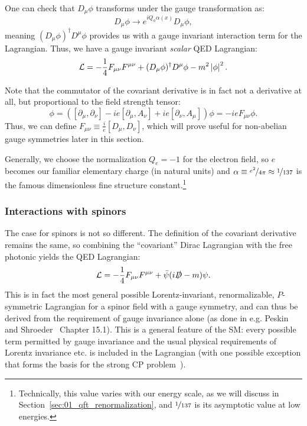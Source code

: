 One can check that $D_\mu\phi$ transforms under the gauge transformation as:
\begin{equation}
	\label{eq:01_qft_gt_maxwell_covariant_derivative_gauge}
	D_\mu\phi \rightarrow e^{iQ_\phi\alpha(x)}D_\mu\phi,
\end{equation}
meaning $(D_\mu\phi)^\dagger D^\mu\phi$ provides us with a gauge invariant interaction term for the Lagrangian.
Thus, we have a gauge invariant \textit{scalar} QED Lagrangian:
\begin{equation}
	\label{eq:01_qft_gt_maxwell_scalar_lagrangian}
	\mathcal L = -\frac{1}{4}F_{\mu\nu}F^{\mu\nu} + (D_\mu\phi)^\dagger D^\mu\phi - m^2\left\lvert \phi \right\rvert^2.
\end{equation}

Note that the commutator of the covariant derivative is in fact not a derivative at all, but proportional to the field strength tensor:
\begin{equation}
	[D_\mu, D_\nu]\phi = ([\partial_\mu, \partial_\nu] - ie[\partial_\mu, A_\nu] + ie[\partial_\nu, A_\mu])\phi = -ieF_{\mu\nu}\phi.
\end{equation}
Thus, we can define $F_{\mu\nu} \equiv \frac{i}{e}[D_\mu, D_\nu]$, which will prove useful for non-abelian gauge symmetries later in this section.

Generally, we choose the normalization $Q_e = -1$ for the electron field, so $e$ becomes our familiar elementary charge (in natural units) and $\alpha\equiv\cnicefrac{e^2}{4\pi} \approx \cnicefrac{1}{137}$ is the famous dimensionless fine structure constant.\footnote{Technically, this value varies with our energy scale, as we will discuss in Section~\ref{sec:01_qft_renormalization}, and $\cnicefrac{1}{137}$ is its asymptotic value at low energies.}

\subsubsection{Interactions with spinors}

The case for spinors is not so different. 
The definition of the covariant derivative remains the same, so combining the ``covariant'' Dirac Lagrangian with the free photonic yields the QED Lagrangian:
\begin{equation}
	\label{eq:01_qft_gt_maxwell_qed_lagrangian}
	\mathcal L = -\frac{1}{4}F_{\mu\nu}F^{\mu\nu} + \bar\psi(i\slashed D - m)\psi.
\end{equation}
This is in fact the most general possible Lorentz-invariant, renormalizable, $P$-symmetric Lagrangian for a spinor field with a \UU[1] gauge symmetry, and can thus be derived from the requirement of gauge invariance alone (as done in e.g. Peskin and Shroeder~\cite{Peskin:1995ev} Chapter 15.1).
This is a general feature of the SM: every possible term permitted by gauge invariance and the usual physical requirements of Lorentz invariance etc. is included in the Lagrangian (with one possible exception that forms the basis for the strong CP problem~\cite{Wu:1991rw,Mannel:2007zz}).

